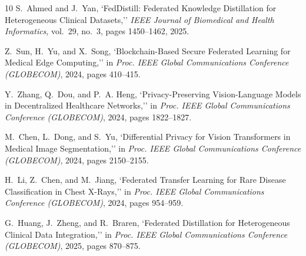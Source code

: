 \documentclass[conference]{IEEEtran}
\begin{document}
\begin{thebibliography}{10}
S.~Ahmed and J.~Yan,
`FedDistill: Federated Knowledge Distillation for Heterogeneous Clinical Datasets,''
\emph{IEEE Journal of Biomedical and Health Informatics}, vol.\ 29, no.\ 3, pages 1450--1462, 2025.

Z.~Sun, H.~Yu, and X.~Song,
`Blockchain-Based Secure Federated Learning for Medical Edge Computing,''
in \emph{Proc. IEEE Global Communications Conference (GLOBECOM)}, 2024, pages 410--415.

Y.~Zhang, Q.~Dou, and P.~A. Heng,
`Privacy-Preserving Vision-Language Models in Decentralized Healthcare Networks,''
in \emph{Proc. IEEE Global Communications Conference (GLOBECOM)}, 2024, pages 1822--1827.

M.~Chen, L.~Dong, and S.~Yu,
`Differential Privacy for Vision Transformers in Medical Image Segmentation,''
in \emph{Proc. IEEE Global Communications Conference (GLOBECOM)}, 2024, pages 2150--2155.

H.~Li, Z.~Chen, and M.~Jiang,
`Federated Transfer Learning for Rare Disease Classification in Chest X-Rays,''
in \emph{Proc. IEEE Global Communications Conference (GLOBECOM)}, 2024, pages 954--959.

G.~Huang, J.~Zheng, and R.~Braren,
`Federated Distillation for Heterogeneous Clinical Data Integration,''
in \emph{Proc. IEEE Global Communications Conference (GLOBECOM)}, 2025, pages 870--875.
\end{thebibliography}
\end{document}
